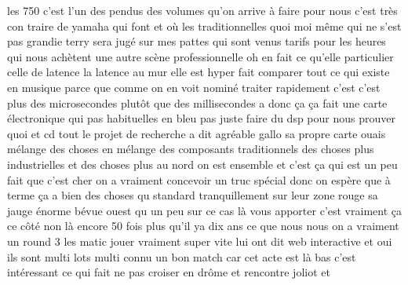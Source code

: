 les 750 c'est l'un des pendus des volumes qu'on arrive à faire pour nous c'est très con traire de yamaha qui font et où les traditionnelles quoi moi même qui ne s'est pas grandie terry sera jugé sur mes pattes qui sont venus tarifs pour les heures qui nous achètent une autre scène professionnelle oh en fait ce qu'elle particulier celle de latence la latence au mur elle est hyper fait comparer tout ce qui existe en musique parce que comme on en voit nominé traiter rapidement c'est c'est plus des microsecondes plutôt que des millisecondes a donc ça ça fait une carte électronique qui pas habituelles en bleu pas juste faire du dsp pour nous prouver quoi et cd tout le projet de recherche a dit agréable gallo sa propre carte ouais mélange des choses en mélange des composants traditionnels des choses plus industrielles et des choses plus au nord on est ensemble et c'est ça qui est un peu fait que c'est cher on a vraiment concevoir un truc spécial donc on espère que à terme ça a bien des choses qu standard tranquillement sur leur zone rouge sa jauge énorme bévue ouest qu un peu sur ce cas là vous apporter c'est vraiment ça ce côté non là encore 50 fois plus qu'il ya dix ans ce que nous nous on a vraiment un round 3 les matic jouer vraiment super vite lui ont dit web interactive et oui ils sont multi lots multi connu un bon match car cet acte est là bas c'est intéressant ce qui fait ne pas croiser en drôme et rencontre joliot et

